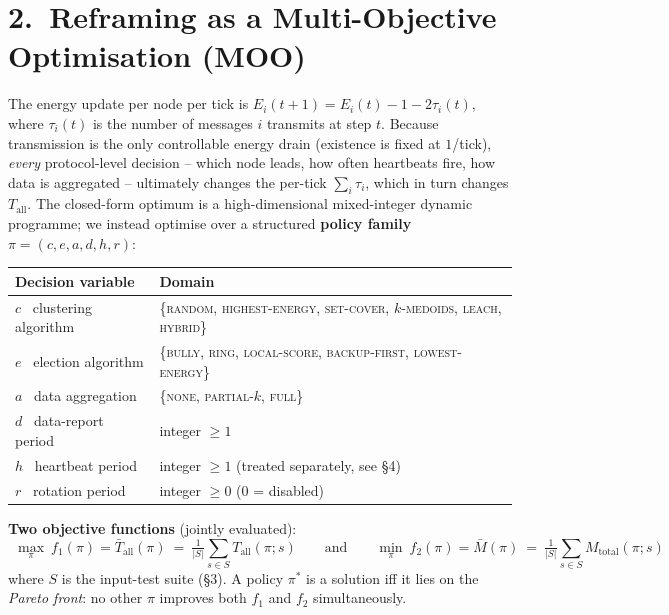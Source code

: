 \documentclass[a4paper,10pt]{article}
\begin{document}
\section*{2.\ Reframing as a Multi-Objective Optimisation (MOO)}
\vspace{-0.4em}
The energy update per node per tick is $E_i(t{+}1)=E_i(t)-1-2\tau_i(t)$, where $\tau_i(t)$
is the number of messages $i$ transmits at step $t$. Because transmission is the only controllable energy drain
(existence is fixed at $1$/tick), \emph{every} protocol-level decision -- which node leads, how often
heartbeats fire, how data is aggregated -- ultimately changes the per-tick $\sum_i \tau_i$, which in turn
changes $T_{\text{all}}$. The closed-form optimum is a high-dimensional mixed-integer dynamic programme;
we instead optimise over a structured \textbf{policy family} $\pi=(c,e,a,d,h,r)$:

\vspace{-0.3em}
\begin{center}\small
\begin{tabular}{@{}ll@{}}
\toprule
\textbf{Decision variable} & \textbf{Domain} \\
\midrule
$c$ \ clustering algorithm   & \{\textsc{random, highest-energy, set-cover, $k$-medoids, leach, hybrid}\} \\
$e$ \ election algorithm     & \{\textsc{bully, ring, local-score, backup-first, lowest-energy}\} \\
$a$ \ data aggregation       & \{\textsc{none, partial-$k$, full}\} \\
$d$ \ data-report period     & integer $\ge 1$ \\
$h$ \ heartbeat period       & integer $\ge 1$ (treated separately, see \S4) \\
$r$ \ rotation period        & integer $\ge 0$ ($0$ = disabled) \\
\bottomrule
\end{tabular}
\end{center}

\textbf{Two objective functions} (jointly evaluated):
\[
\boxed{\ \ \max_\pi \ f_1(\pi)=\bar T_{\text{all}}(\pi)\ =\ \tfrac{1}{|S|}\!\sum_{s\in S}T_{\text{all}}(\pi;s)
\qquad\text{and}\qquad
\min_\pi \ f_2(\pi)=\bar M(\pi)\ =\ \tfrac{1}{|S|}\!\sum_{s\in S}M_{\text{total}}(\pi;s)\ \ }
\]
where $S$ is the input-test suite (\S3). A policy $\pi^\ast$ is a solution iff it lies on the \emph{Pareto front}:
no other $\pi$ improves both $f_1$ and $f_2$ simultaneously.
\end{document}

